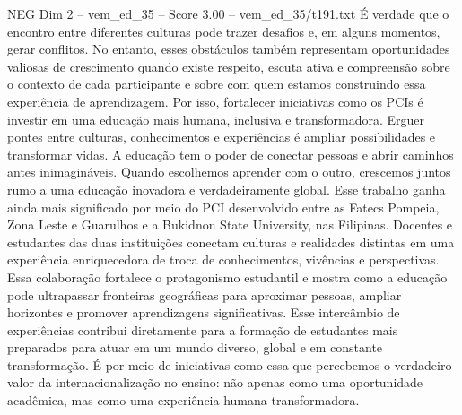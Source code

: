 \begin{textsample}{NEG Dim 2 – vem\_ed\_35 – Score 3.00 – vem\_ed\_35/t191.txt}
É verdade que o encontro entre diferentes culturas pode trazer desafios e, em alguns momentos, gerar conflitos.
No entanto, esses obstáculos também representam oportunidades valiosas de crescimento quando existe respeito, escuta ativa e compreensão sobre o contexto de cada participante e sobre com quem estamos construindo essa experiência de aprendizagem.
Por isso, fortalecer iniciativas como os PCIs é investir em uma educação mais humana, inclusiva e transformadora.
Erguer pontes entre culturas, conhecimentos e experiências é ampliar possibilidades e transformar vidas.
A educação tem o poder de conectar pessoas e abrir caminhos antes inimagináveis.
Quando escolhemos aprender com o outro, crescemos juntos rumo a uma educação inovadora e verdadeiramente global.
Esse trabalho ganha ainda mais significado por meio do PCI desenvolvido entre as Fatecs Pompeia, Zona Leste e Guarulhos e a Bukidnon State University, nas Filipinas.
Docentes e estudantes das duas instituições conectam culturas e realidades distintas em uma experiência enriquecedora de troca de conhecimentos, vivências e perspectivas.
Essa colaboração fortalece o protagonismo estudantil e mostra como a educação pode ultrapassar fronteiras geográficas para aproximar pessoas, ampliar horizontes e promover aprendizagens significativas.
Esse intercâmbio de experiências contribui diretamente para a formação de estudantes mais preparados para atuar em um mundo diverso, global e em constante transformação.
É por meio de iniciativas como essa que percebemos o verdadeiro valor da internacionalização no ensino: não apenas como uma oportunidade acadêmica, mas como uma experiência humana transformadora.

\end{textsample}
